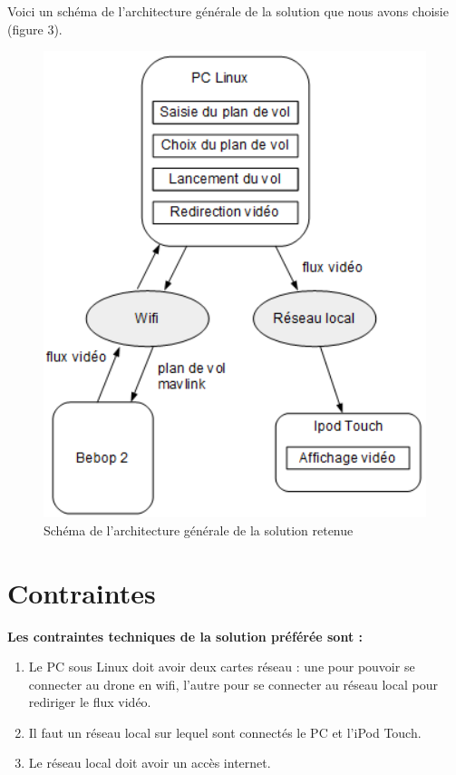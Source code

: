 \documentclass{article}
\begin{document}
        \indent Voici un schéma de l'architecture générale de la solution que nous avons choisie (figure 3).   
 		\begin{figure}[!ht]
 		\begin{center}
 		\includegraphics[scale=0.7]{Solution_PC.PNG}
 		\caption{Schéma de l'architecture générale de la solution retenue}
 		\end{center}
		\end{figure}
\newpage
\section{Contraintes}

	\begin{flushleft}
	\textbf{Les contraintes techniques de la solution préférée sont :}
	\end{flushleft}
		\begin{enumerate}
        \item Le PC sous Linux doit avoir deux cartes réseau : une pour pouvoir se connecter au drone en wifi, l'autre pour se connecter au réseau local pour rediriger le flux vidéo.
        \item Il faut un réseau local sur lequel sont connectés le PC et l'iPod Touch.
        \item Le réseau local doit avoir un accès internet.
        \end{enumerate}
	
\end{document}
